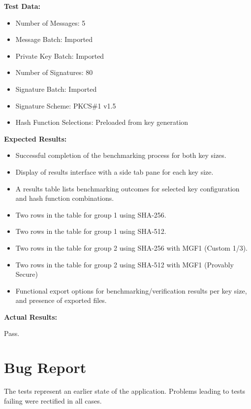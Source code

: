 \documentclass[]{final_report}
\theoremstyle{definition}
\begin{document}
\textbf{Test Data:}
\begin{itemize}
    \item Number of Messages: 5
    \item Message Batch: Imported
    \item Private Key Batch: Imported
     \item Number of Signatures: 80
     \item Signature Batch: Imported
    \item Signature Scheme: PKCS\#1 v1.5
     \item Hash Function Selections: Preloaded from key generation
\end{itemize}

\textbf{Expected Results:}
\begin{itemize}
    \item Successful completion of the benchmarking process for both key sizes.
    \item Display of results interface with a side tab pane for each key size.
    \item A results table lists benchmarking outcomes for selected key configuration and hash function combinations.
    \item Two rows in the table for group 1 using SHA-256.
    \item Two rows in the table for group 1 using SHA-512.
    \item Two rows in the table for group 2 using SHA-256 with MGF1 (Custom 1/3).
    \item Two rows in the table for group 2 using SHA-512 with MGF1 (Provably Secure)
    \item Functional export options for benchmarking/verification results per key size, and presence of exported files.
\end{itemize}

\textbf{Actual Results:} 

Pass.



\section*{Bug Report}
 
 The tests represent an earlier state of the application. Problems leading to tests failing were rectified in all cases.
 
 
\end{document}
